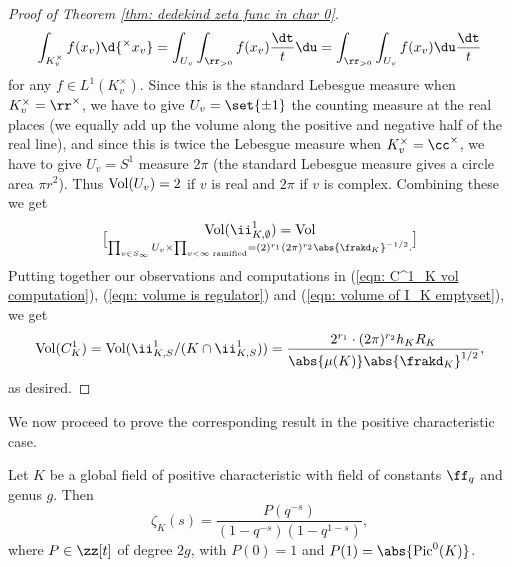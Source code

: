 \documentclass[11pt, x11names, openany]{book}
\begin{document}
\begin{proof}[Proof of Theorem \ref{thm: dedekind zeta func in char 0}]
\begin{equation*}
    \int_{K_v^\times} f(x_v) \d{^\times x_v}  = \int_{U_v} \int_{\rr_{> 0}} f(x_v) \frac{\dt}{t} \du = \int_{\rr_{> 0}} \int_{U_v} f(x_v) \du \frac{\dt}{t}
\end{equation*}
for any $f \in L^1(K_v^\times)$. Since this is the standard Lebesgue measure when $K_v^\times = \rr^\times$, we have to give $U_v = \set{\pm 1}$ the counting measure at the real places (we equally add up the volume along the positive and negative half of the real line), and since this is twice the Lebesgue measure when $K_v^\times = \cc^\times$, we have to give $U_v = S^1$ measure $2 \pi$ (the standard Lebesgue measure gives a circle area $\pi r^2$). Thus $\operatorname{Vol}(U_v) = 2$ if $v$ is real and $2 \pi$ if $v$ is complex. Combining these we get
\begin{equation}
    \label{eqn: volume of I_K emptyset}
    \vol(\ii^1_{K, \emptyset}) = \vol \brack{ \prod_{v \in S_\infty} U_v \times \prod_{v < \infty \text{ ramified}} } = (2)^{r_1} (2 \pi)^{r_2} \abs{\frakd_K}^{-1/2}.
\end{equation}
Putting together our observations and computations in  (\ref{eqn: C^1_K vol computation}), (\ref{eqn: volume is regulator}) and (\ref{eqn: volume of I_K emptyset}), we get  
\begin{equation*}
    \vol(C^1_K) = \vol(\ii^1_{K, S}/(K \cap \ii^1_{K, S})) = \frac{2^{r_1} \cdot (2 \pi)^{r_2} h_K R_K}{\abs{\mu(K)} \abs{\frakd_K}^{1/2}},
\end{equation*}
as desired.
\end{proof}

We now proceed to prove the corresponding result in the positive characteristic case.

\begin{theorem}
    \label{thm: dedekind zeta func in char > 0}
Let $K$ be a global field of positive characteristic with field of constants $\ff_q$ and genus $g$. Then
\begin{equation*}
    \zeta_K(s) = \frac{P(q^{-s})}{(1 - q^{-s}) (1 - q^{1-s})},
\end{equation*}
where $P \in \zz[t]$ of degree $2g$, with $P(0) = 1$ and $P(1) = \abs{\pic^0(K)}$.
\end{theorem}
\end{document}
